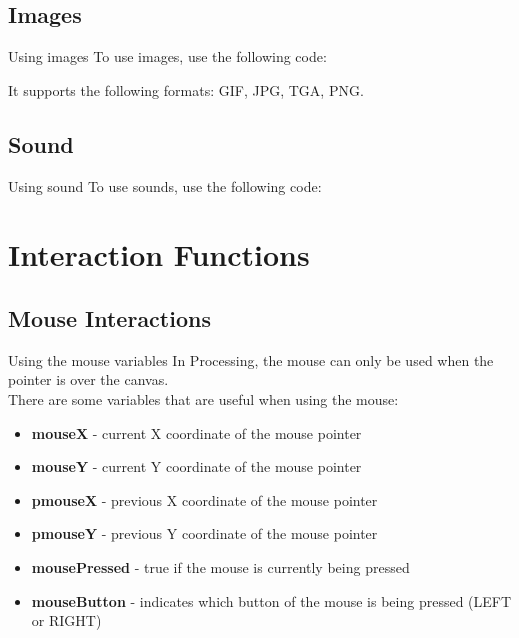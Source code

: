 \documentclass{beamer}
\begin{document}
\subsection{Images}

\begin{frame}{Using images}
To use images, use the following code:\\

\lstImages

It supports the following formats: GIF, JPG, TGA, PNG.
\end{frame}

\subsection{Sound}

\begin{frame}{Using sound}
To use sounds, use the following code:\\

\lstSounds
\end{frame}

\section{Interaction Functions}

\subsection{Mouse Interactions}

\begin{frame}{Using the mouse variables}
In Processing, the mouse can only be used when the pointer
is over the canvas.\\
There are some variables that are useful when using the mouse:

\begin{itemize}
\item{\textbf{mouseX} - current X coordinate of the mouse pointer}
\item{\textbf{mouseY} - current Y coordinate of the mouse pointer}
\item{\textbf{pmouseX} - previous X coordinate of the mouse pointer}
\item{\textbf{pmouseY} - previous Y coordinate of the mouse pointer}
\item{\textbf{mousePressed} - true if the mouse is currently being pressed}
\item{\textbf{mouseButton} - indicates which button of the mouse is being pressed (LEFT or RIGHT)}
\end{itemize}
\end{frame}
\end{document}
